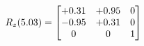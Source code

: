 \documentclass[preview]{standalone}
\begin{document}
\begin{align*}
\special{dvisvgm:raw <g id='unique000'>}R_{z}(5.03) = \begin{bmatrix}+0.31 & +0.95 & 0 \\-0.95 & +0.31 & 0 \\0 & 0 & 1\end{bmatrix}\special{dvisvgm:raw </g>}
\end{align*}
\end{document}
